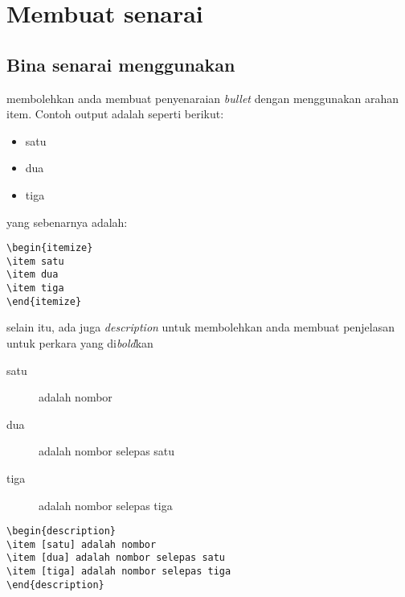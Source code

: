 \chapter{Membuat senarai}
\section{Bina senarai menggunakan \latex{}}
\latex{} membolehkan anda membuat penyenaraian \emph{bullet} dengan menggunakan arahan \mbox{{\\item}}.
Contoh output adalah seperti berikut:\\

\begin{itemize}
\item satu
\item dua
\item tiga
\end{itemize}

yang sebenarnya adalah:\\

\begin{Verbatim}[frame=single]
\begin{itemize}
\item satu
\item dua
\item tiga
\end{itemize}
\end{Verbatim}

selain itu, ada juga \emph{description} untuk membolehkan anda membuat penjelasan untuk perkara yang di\emph{bold}kan

\begin{description}
\item [satu] adalah nombor
\item [dua] adalah nombor selepas satu
\item [tiga] adalah nombor selepas tiga
\end{description}


\begin{Verbatim}[frame=single]
\begin{description}
\item [satu] adalah nombor
\item [dua] adalah nombor selepas satu
\item [tiga] adalah nombor selepas tiga
\end{description}
\end{Verbatim}


